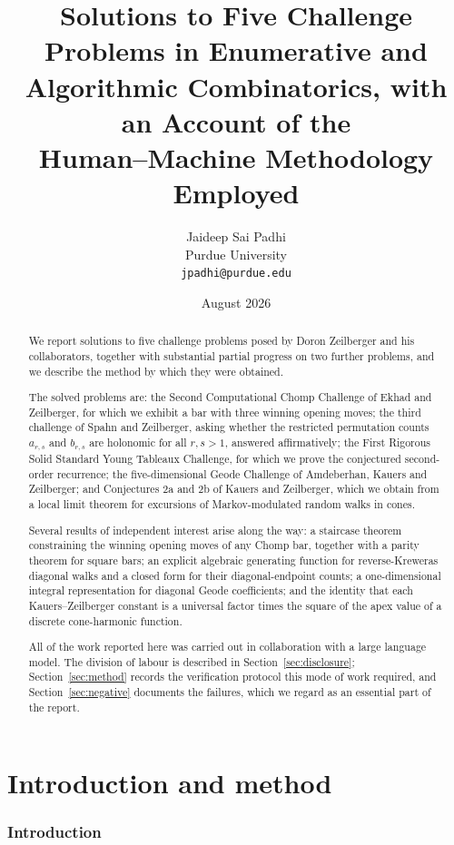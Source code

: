 \documentclass[11pt]{article}
\title{Solutions to Five Challenge Problems in Enumerative and\\
Algorithmic Combinatorics, with an Account of the\\
Human--Machine Methodology Employed}
\author{Jaideep Sai Padhi\\
\small Purdue University\\
\small \texttt{jpadhi@purdue.edu}}
\date{August 2026}
\theoremstyle{definition}
\begin{document}
\maketitle

\begin{abstract}
We report solutions to five challenge problems posed by Doron Zeilberger and
his collaborators, together with substantial partial progress on two further
problems, and we describe the method by which they were obtained.

The solved problems are: the Second Computational Chomp Challenge of Ekhad and
Zeilberger, for which we exhibit a bar with three winning opening moves; the
third challenge of Spahn and Zeilberger, asking whether the restricted
permutation counts $a_{r,s}$ and $b_{r,s}$ are holonomic for all $r,s>1$,
answered affirmatively; the First Rigorous Solid Standard Young Tableaux
Challenge, for which we prove the conjectured second-order recurrence; the
five-dimensional Geode Challenge of Amdeberhan, Kauers and Zeilberger; and
Conjectures 2a and 2b of Kauers and Zeilberger, which we obtain from a local
limit theorem for excursions of Markov-modulated random walks in cones.

Several results of independent interest arise along the way: a staircase
theorem constraining the winning opening moves of any Chomp bar, together with
a parity theorem for square bars; an explicit algebraic generating function for
reverse-Kreweras diagonal walks and a closed form for their diagonal-endpoint
counts; a one-dimensional integral representation for diagonal Geode
coefficients; and the identity that each Kauers--Zeilberger constant is a
universal factor times the square of the apex value of a discrete
cone-harmonic function.

All of the work reported here was carried out in collaboration with a large
language model. The division of labour is described in
Section~\ref{sec:disclosure}; Section~\ref{sec:method} records the verification
protocol this mode of work required, and Section~\ref{sec:negative} documents
the failures, which we regard as an essential part of the report.
\end{abstract}

\tableofcontents
\newpage

\part{Introduction and method}

\section{Introduction}\label{sec:intro}
\end{document}
